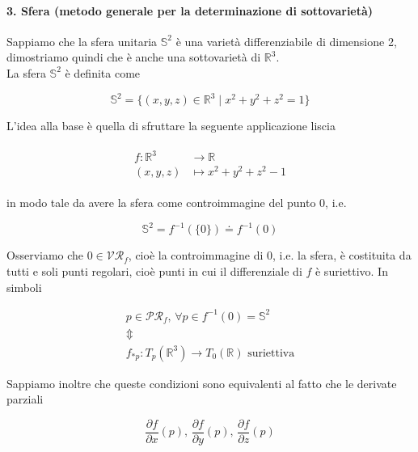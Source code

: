 \paragraph{3. Sfera (metodo generale per la determinazione di sottovarietà)}

Sappiamo che la sfera unitaria $ \mathbb{S}^{2} $ è una varietà differenziabile di dimensione 2, dimostriamo quindi che è anche una sottovarietà di $ \mathbb{R}^{3} $.\\
La sfera $ \mathbb{S}^{2} $ è definita come

\begin{equation}
	\mathbb{S}^{2} = \{ (x,y,z) \in \mathbb{R}^{3} \mid x^{2} + y^{2} + z^{2} = 1 \}
\end{equation}

L'idea alla base è quella di sfruttare la seguente applicazione liscia

\begin{align}
	\begin{split}
		f : \mathbb{R}^{3} &\to \mathbb{R}\\
		(x,y,z) &\mapsto x^{2} + y^{2} + z^{2} - 1
	\end{split}
\end{align}

in modo tale da avere la sfera come controimmagine del punto 0, i.e.

\begin{equation}
\mathbb{S}^{2} = f^{-1}(\{0\}) \doteq f^{-1}(0)
\end{equation}

Osserviamo che $ 0 \in \mathcal{VR}_{f} $, cioè la controimmagine di 0, i.e. la sfera, è costituita da tutti e soli punti regolari, cioè punti in cui il differenziale di $ f $ è suriettivo. In simboli

\begin{gather}
	p \in \mathcal{PR}_{f}, \, \forall p \in f^{-1}(0) = \mathbb{S}^{2}\nonumber\\
	\Updownarrow\\
	f_{*p} : T_{p}(\mathbb{R}^{3}) \to T_{0}(\mathbb{R}) \text{ suriettiva}\nonumber
\end{gather}

Sappiamo inoltre che queste condizioni sono equivalenti al fatto che le derivate parziali

\begin{equation}
	\dfrac{\partial f}{\partial x} (p), \, \dfrac{\partial f}{\partial y} (p), \, \dfrac{\partial f}{\partial z} (p)
\end{equation}

